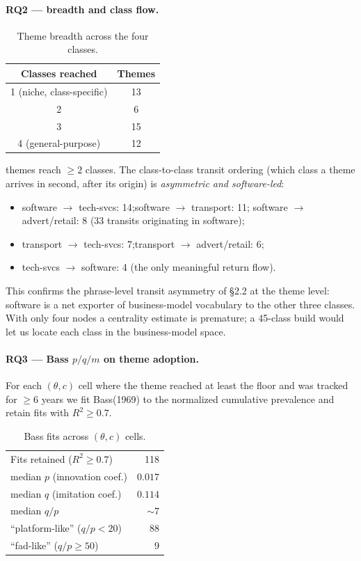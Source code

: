 \documentclass[11pt]{report}
\begin{document}
\paragraph{RQ2 --- breadth and class flow.}
\begin{table}[h]\centering\small
\caption{Theme breadth across the four classes.}
\begin{tabular}{cc}
\toprule
Classes reached & Themes \\
\midrule
1 (niche, class-specific) & 13 \\
2 & 6 \\
3 & 15 \\
4 (general-purpose)       & 12 \\
\bottomrule
\end{tabular}
\end{table}

 themes reach $\geq 2$ classes. The class-to-class transit
ordering (which class a theme arrives in second, after its origin) is
\emph{asymmetric and software-led}:
\begin{itemize}[nosep]
\item software $\to$ tech-svcs: 14;\quad software $\to$ transport: 11;\quad
software $\to$ advert/retail: 8 (33 transits originating in software);
\item transport $\to$ tech-svcs: 7;\quad transport $\to$ advert/retail: 6;
\item tech-svcs $\to$ software: 4 (the only meaningful return flow).
\end{itemize}
\noindent This confirms the phrase-level transit asymmetry of §2.2 at the
theme level: software is a net exporter of business-model vocabulary to the
other three classes. With only four nodes a centrality estimate is premature;
a 45-class build would let us locate each class in the business-model space.

\paragraph{RQ3 --- Bass $p/q/m$ on theme adoption.} For each $(\theta, c)$ cell
where the theme reached at least the floor and was tracked for $\geq 6$ years
we fit Bass(1969) to the normalized cumulative prevalence and retain fits with
$R^2 \geq 0.7$.

\begin{table}[h]\centering\small
\caption{Bass fits across $(\theta, c)$ cells.}
\begin{tabular}{lr}
\toprule
Fits retained ($R^2 \geq 0.7$) & 118 \\
median $p$ (innovation coef.) & $0.017$ \\
median $q$ (imitation coef.)  & $0.114$ \\
median $q/p$                   & $\sim 7$ \\
``platform-like'' ($q/p<20$)   & 88 \\
``fad-like'' ($q/p\geq 50$)    & 9 \\
\bottomrule
\end{tabular}
\end{table}
\end{document}
